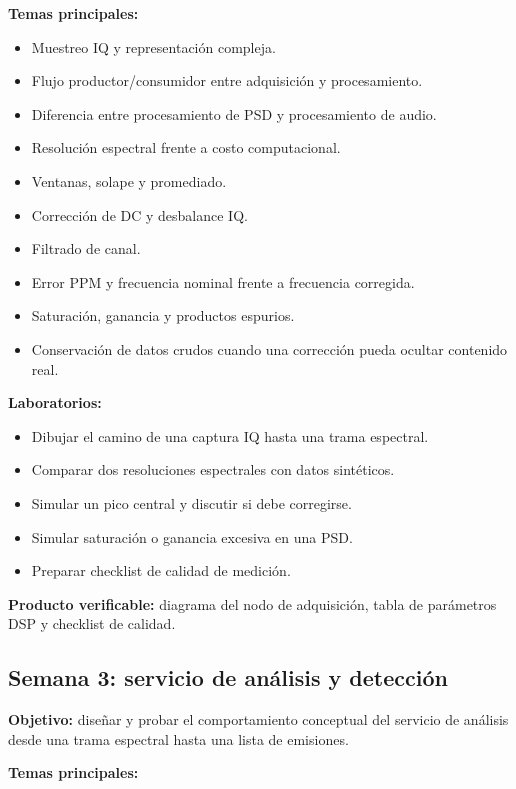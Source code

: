 \documentclass[11pt,a4paper]{article}
\newcommand{\producto}{\textbf{Producto verificable:} }
\begin{document}
\textbf{Temas principales:}

\begin{itemize}
  \item Muestreo IQ y representación compleja.
  \item Flujo productor/consumidor entre adquisición y procesamiento.
  \item Diferencia entre procesamiento de PSD y procesamiento de audio.
  \item Resolución espectral frente a costo computacional.
  \item Ventanas, solape y promediado.
  \item Corrección de DC y desbalance IQ.
  \item Filtrado de canal.
  \item Error PPM y frecuencia nominal frente a frecuencia corregida.
  \item Saturación, ganancia y productos espurios.
  \item Conservación de datos crudos cuando una corrección pueda ocultar contenido real.
\end{itemize}

\textbf{Laboratorios:}

\begin{itemize}
  \item Dibujar el camino de una captura IQ hasta una trama espectral.
  \item Comparar dos resoluciones espectrales con datos sintéticos.
  \item Simular un pico central y discutir si debe corregirse.
  \item Simular saturación o ganancia excesiva en una PSD.
  \item Preparar checklist de calidad de medición.
\end{itemize}

\producto diagrama del nodo de adquisición, tabla de parámetros DSP y checklist de calidad.

\subsection*{Semana 3: servicio de análisis y detección}

\textbf{Objetivo:} diseñar y probar el comportamiento conceptual del servicio de análisis desde una trama espectral hasta una lista de emisiones.

\textbf{Temas principales:}
\end{document}
